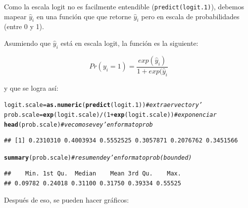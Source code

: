 \documentclass[onesided]{article}\usepackage[]{graphicx}\usepackage[]{color}
\makeatletter
\newcommand{\hlnum}[1]{\textcolor[rgb]{0.686,0.059,0.569}{#1}}%
\newcommand{\hlcom}[1]{\textcolor[rgb]{0.678,0.584,0.686}{\textit{#1}}}%
\newcommand{\hlopt}[1]{\textcolor[rgb]{0,0,0}{#1}}%
\newcommand{\hlstd}[1]{\textcolor[rgb]{0.345,0.345,0.345}{#1}}%
\newcommand{\hlkwb}[1]{\textcolor[rgb]{0.69,0.353,0.396}{#1}}%
\newcommand{\hlkwd}[1]{\textcolor[rgb]{0.737,0.353,0.396}{\textbf{#1}}}%
\newenvironment{kframe}{%
 \def\at@end@of@kframe{}%
 \ifinner\ifhmode%
  \def\at@end@of@kframe{\end{minipage}}%
  \begin{minipage}{\columnwidth}%
 \fi\fi%
 \def\FrameCommand##1{\hskip\@totalleftmargin \hskip-\fboxsep
 \colorbox{shadecolor}{##1}\hskip-\fboxsep
     \hskip-\linewidth \hskip-\@totalleftmargin \hskip\columnwidth}%
 \MakeFramed {\advance\hsize-\width
   \@totalleftmargin\z@ \linewidth\hsize
   \@setminipage}}%
 {\par\unskip\endMakeFramed%
 \at@end@of@kframe}
\newenvironment{knitrout}{}{} %
\makeatother
\begin{document}
Como la escala logit no es facilmente entendible (\texttt{predict(logit.1)}), debemos mapear $\hat y_{i}$ en una funci\'on que que retorne $\hat y_{i}$ pero en escala de probabilidades (entre 0 y 1). 

Asumiendo que $\hat y_{i}$ est\'a en escala logit, la funci\'on es la siguiente:

\begin{equation}\label{logit:prob}
Pr(y_{i}=1) = \frac{exp(\hat y_{i})}{1+exp(\hat y_{i}}
\end{equation}

y que se logra as\'i:

\begin{knitrout}
\color{fgcolor}\begin{kframe}
\begin{alltt}
\hlstd{logit.scale} \hlkwb{=} \hlkwd{as.numeric}\hlstd{(}\hlkwd{predict}\hlstd{(logit.1))} \hlcom{# extraer vector y'}
\hlstd{prob.scale} \hlkwb{=} \hlkwd{exp}\hlstd{(logit.scale)}\hlopt{/}\hlstd{(}\hlnum{1}\hlopt{+}\hlkwd{exp}\hlstd{(logit.scale))} \hlcom{# exponenciar}
\hlkwd{head}\hlstd{(prob.scale)} \hlcom{# ve como se ve y' en formato prob}
\end{alltt}
\begin{verbatim}
## [1] 0.2310310 0.4003934 0.5552525 0.3057871 0.2076762 0.3451566
\end{verbatim}
\begin{alltt}
\hlkwd{summary}\hlstd{(prob.scale)} \hlcom{# resumen de y' en formato prob (bounded)}
\end{alltt}
\begin{verbatim}
##    Min. 1st Qu.  Median    Mean 3rd Qu.    Max. 
## 0.09782 0.24018 0.31100 0.31750 0.39334 0.55525
\end{verbatim}
\end{kframe}
\end{knitrout}

Despu\'es de eso, se pueden hacer gr\'aficos:
\end{document}
